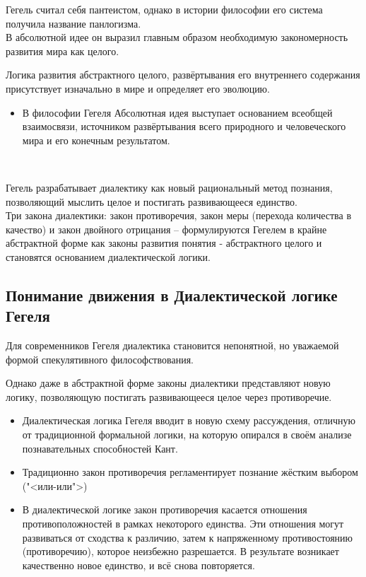 \documentclass[main.tex]{subfiles}
\begin{document}
{\parindent0pt
Гегель считал себя пантеистом, однако в истории философии его система получила название панлогизма.
}
\ \\

{\parindent0pt
В абсолютной идее он выразил главным образом необходимую закономерность развития мира как целого.
}
\ \\

{\parindent0pt
Логика развития абстрактного целого, развёртывания его внутреннего содержания присутствует изначально в мире и определяет его эволюцию.
\begin{itemize}[nosep,leftmargin=0.5cm]
\item В философии Гегеля Абсолютная идея выступает основанием всеобщей взаимосвязи, источником развёртывания всего природного и человеческого мира и его конечным результатом.
\end{itemize}
}
\ 

{\parindent0pt
Гегель разрабатывает диалектику как новый рациональный метод познания, позволяющий мыслить целое и постигать развивающееся единство.
}
\ \\

{\parindent0pt
Три закона диалектики: закон противоречия, закон меры (перехода количества в качество) и закон двойного отрицания -- формулируются Гегелем в крайне абстрактной форме как законы развития понятия - абстрактного целого и становятся основанием диалектической логики.
}



\subsection{Понимание движения в Диалектической логике Гегеля}

{\parindent0pt
Для современников Гегеля диалектика становится непонятной, но уважаемой формой спекулятивного философствования.
}
\ \\

{\parindent0pt
Однако даже в абстрактной форме законы диалектики представляют новую логику, позволяющую постигать развивающееся целое через противоречие.
\begin{itemize}[nosep,leftmargin=0.5cm]
\item Диалектическая логика Гегеля вводит в новую схему рассуждения, отличную от традиционной формальной логики, на которую опирался в своём анализе познавательных способностей Кант.
\item Традиционно закон противоречия регламентирует познание жёстким выбором ("<или-или">)
\item В диалектической логике закон противоречия касается отношения противоположностей в рамках некоторого единства.
Эти отношения могут развиваться от сходства к различию, затем к напряженному противостоянию (противоречию), которое неизбежно разрешается.
В результате возникает качественно новое единство, и всё снова повторяется.
\end{itemize}
}
\ 
\end{document}
